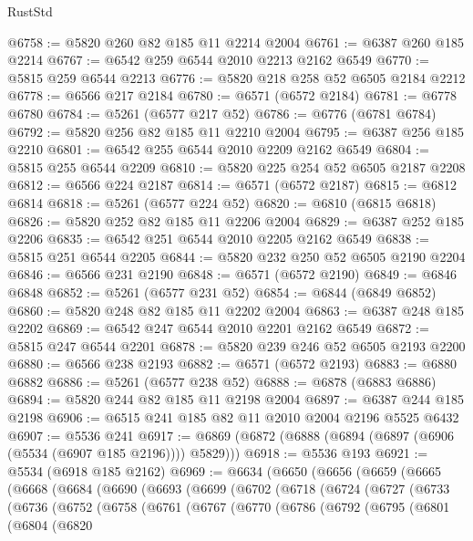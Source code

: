 \begin{lexlean}{RustStd}
\begin{coremodule}
@6758 := @5820 @260 @82 @185 @11 @2214 @2004
@6761 := @6387 @260 @185 @2214
@6767 := @6542 @259 @6544 @2010 @2213 @2162 @6549
@6770 := @5815 @259 @6544 @2213
@6776 := @5820 @218 @258 @52 @6505 @2184 @2212
@6778 := @6566 @217 @2184
@6780 := @6571 (@6572 @2184)
@6781 := @6778 @6780
@6784 := @5261 (@6577 @217 @52)
@6786 := @6776 (@6781 @6784)
@6792 := @5820 @256 @82 @185 @11 @2210 @2004
@6795 := @6387 @256 @185 @2210
@6801 := @6542 @255 @6544 @2010 @2209 @2162 @6549
@6804 := @5815 @255 @6544 @2209
@6810 := @5820 @225 @254 @52 @6505 @2187 @2208
@6812 := @6566 @224 @2187
@6814 := @6571 (@6572 @2187)
@6815 := @6812 @6814
@6818 := @5261 (@6577 @224 @52)
@6820 := @6810 (@6815 @6818)
@6826 := @5820 @252 @82 @185 @11 @2206 @2004
@6829 := @6387 @252 @185 @2206
@6835 := @6542 @251 @6544 @2010 @2205 @2162 @6549
@6838 := @5815 @251 @6544 @2205
@6844 := @5820 @232 @250 @52 @6505 @2190 @2204
@6846 := @6566 @231 @2190
@6848 := @6571 (@6572 @2190)
@6849 := @6846 @6848
@6852 := @5261 (@6577 @231 @52)
@6854 := @6844 (@6849 @6852)
@6860 := @5820 @248 @82 @185 @11 @2202 @2004
@6863 := @6387 @248 @185 @2202
@6869 := @6542 @247 @6544 @2010 @2201 @2162 @6549
@6872 := @5815 @247 @6544 @2201
@6878 := @5820 @239 @246 @52 @6505 @2193 @2200
@6880 := @6566 @238 @2193
@6882 := @6571 (@6572 @2193)
@6883 := @6880 @6882
@6886 := @5261 (@6577 @238 @52)
@6888 := @6878 (@6883 @6886)
@6894 := @5820 @244 @82 @185 @11 @2198 @2004
@6897 := @6387 @244 @185 @2198
@6906 := @6515 @241 @185 @82 @11 @2010 @2004 @2196 @5525 @6432
@6907 := @5536 @241
@6917 := @6869 (@6872 (@6888 (@6894 (@6897 (@6906 (@5534 (@6907 @185 @2196)))) @5829)))
@6918 := @5536 @193
@6921 := @5534 (@6918 @185 @2162)
@6969 := @6634
    (@6650
      (@6656
        (@6659
          (@6665
            (@6668
              (@6684
                (@6690
                  (@6693
                    (@6699
                      (@6702
                        (@6718
                          (@6724
                            (@6727
                              (@6733
                                (@6736
                                  (@6752
                                    (@6758
                                      (@6761
                                        (@6767
                                          (@6770
                                            (@6786
                                              (@6792
                                                (@6795
                                                  (@6801
                                                    (@6804
                                                      (@6820

\end{coremodule}
\end{lexlean}
